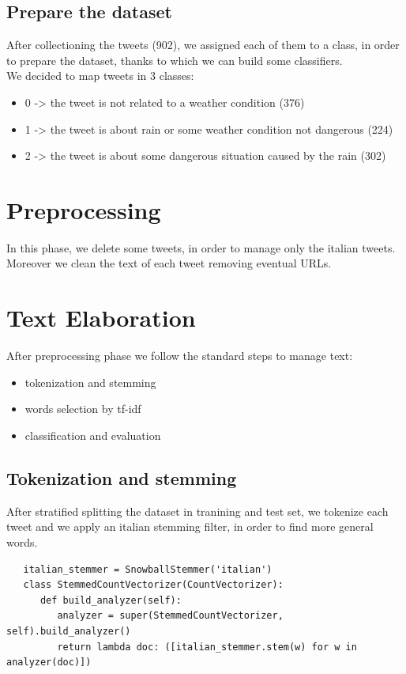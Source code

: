 \documentclass[a4paper]{article}
\begin{document}
\subsection{Prepare the dataset}
After collectioning the tweets (902), we assigned each of them to a class, in order to prepare the dataset, thanks to which we can build some classifiers.\\
We decided to map tweets in 3 classes:
\begin{itemize}
\item 0 -> the tweet is not related to a weather condition (376)
\item 1 -> the tweet is about rain or some weather condition not dangerous (224)
\item 2 -> the tweet is about some dangerous situation caused by the rain (302)
\end{itemize}

\section{Preprocessing}
In this phase, we delete some tweets, in order to manage only the italian tweets.\\
Moreover we clean the text of each tweet removing eventual URLs.

\section{Text Elaboration}
After preprocessing phase we follow the standard steps to manage text:
\begin{itemize}
\item tokenization and stemming
\item words selection by tf-idf
\item classification and evaluation
\end{itemize}

\subsection{Tokenization and stemming}
After stratified splitting the dataset in tranining and test set, we tokenize each tweet and we apply an italian stemming filter, in order to find more general words.
\begin{verbatim}
   italian_stemmer = SnowballStemmer('italian')
   class StemmedCountVectorizer(CountVectorizer):
      def build_analyzer(self):
         analyzer = super(StemmedCountVectorizer, self).build_analyzer()
         return lambda doc: ([italian_stemmer.stem(w) for w in analyzer(doc)])
\end{verbatim}
\end{document}
